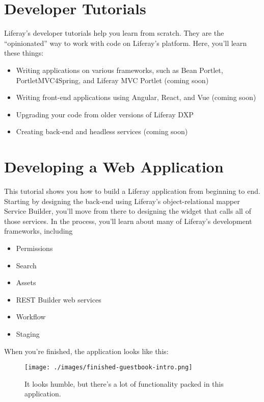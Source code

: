 \chapter{Developer Tutorials}\label{developer-tutorials}

Liferay's developer tutorials help you learn from scratch. They are the
``opinionated'' way to work with code on Liferay's platform. Here,
you'll learn these things:

\begin{itemize}
\item
  Writing applications on various frameworks, such as Bean Portlet,
  PortletMVC4Spring, and Liferay MVC Portlet (coming soon)
\item
  Writing front-end applications using Angular, React, and Vue (coming
  soon)
\item
  Upgrading your code from older versions of Liferay DXP
\item
  Creating back-end and headless services (coming soon)
\end{itemize}

\chapter{Developing a Web
Application}\label{developing-a-web-application}

This tutorial shows you how to build a Liferay application from
beginning to end. Starting by designing the back-end using Liferay's
object-relational mapper Service Builder, you'll move from there to
designing the widget that calls all of those services. In the process,
you'll learn about many of Liferay's development frameworks, including

\begin{itemize}
\tightlist
\item
  Permissions
\item
  Search
\item
  Assets
\item
  REST Builder web services
\item
  Workflow
\item
  Staging
\end{itemize}

When you're finished, the application looks like this:

\begin{figure}
\centering
\texttt{[image: ./images/finished-guestbook-intro.png]}
\caption{It looks humble, but there's a lot of functionality packed in
this application.}
\end{figure}

